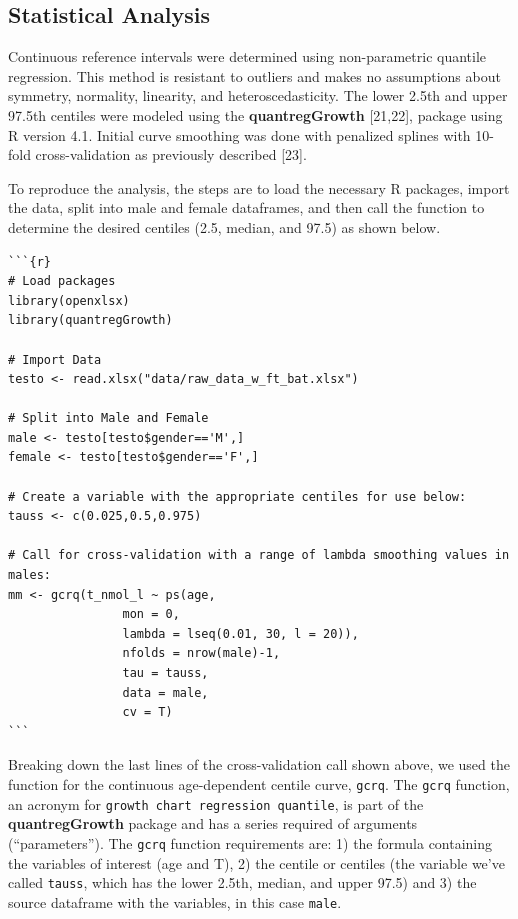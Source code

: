 \documentclass[]{elsarticle} %
\begin{document}
\hypertarget{statistical-analysis}{%
\subsection{Statistical Analysis}\label{statistical-analysis}}

Continuous reference intervals were determined using non-parametric
quantile regression. This method is resistant to outliers and makes no
assumptions about symmetry, normality, linearity, and
heteroscedasticity. The lower 2.5th and upper 97.5th centiles were
modeled using the \textbf{quantregGrowth} {[}21,22{]}, package using R
version 4.1. Initial curve smoothing was done with penalized splines
with 10-fold cross-validation as previously described {[}23{]}.

To reproduce the analysis, the steps are to load the necessary R
packages, import the data, split into male and female dataframes, and
then call the function to determine the desired centiles (2.5, median,
and 97.5) as shown below.

\begin{verbatim}
```{r}
# Load packages
library(openxlsx)
library(quantregGrowth)

# Import Data
testo <- read.xlsx("data/raw_data_w_ft_bat.xlsx")

# Split into Male and Female 
male <- testo[testo$gender=='M',]
female <- testo[testo$gender=='F',]

# Create a variable with the appropriate centiles for use below: 
tauss <- c(0.025,0.5,0.975)

# Call for cross-validation with a range of lambda smoothing values in males:
mm <- gcrq(t_nmol_l ~ ps(age,
                mon = 0,
                lambda = lseq(0.01, 30, l = 20)),
                nfolds = nrow(male)-1,
                tau = tauss,
                data = male,
                cv = T)
```
\end{verbatim}

Breaking down the last lines of the cross-validation call shown above,
we used the function for the continuous age-dependent centile curve,
\texttt{gcrq}. The \texttt{gcrq} function, an acronym for
\texttt{growth\ chart\ regression\ quantile}, is part of the
\textbf{quantregGrowth} package and has a series required of arguments
(``parameters''). The \texttt{gcrq} function requirements are: 1) the
formula containing the variables of interest (age and T), 2) the centile
or centiles (the variable we've called \texttt{tauss}, which has the
lower 2.5th, median, and upper 97.5) and 3) the source dataframe with
the variables, in this case \texttt{male}.
\end{document}
